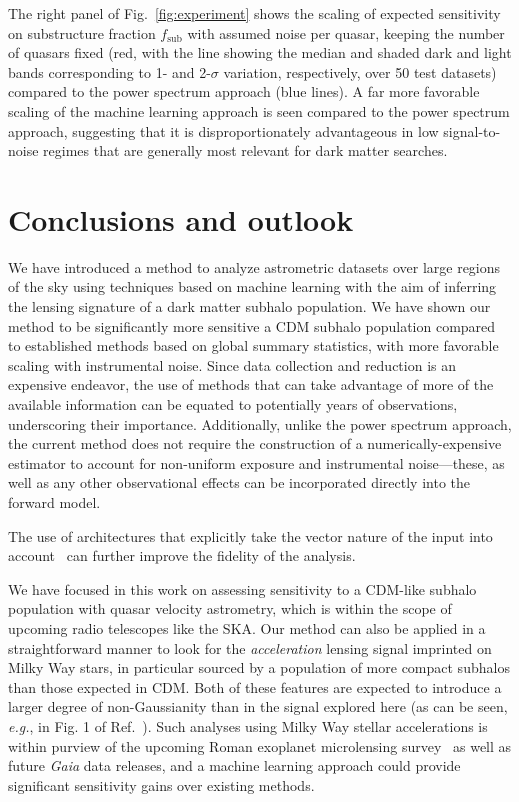 \documentclass[preprint]{article}
\begin{document}
The right panel of Fig.~\ref{fig:experiment} shows the scaling of expected sensitivity on substructure fraction $f_\mathrm{sub}$ with assumed noise per quasar, keeping the number of quasars fixed (red, with the line showing the median and shaded dark and light bands corresponding to 1- and 2-$\sigma$ variation, respectively, over 50 test datasets) compared to the power spectrum approach (blue lines). A far more favorable scaling of the machine learning approach is seen compared to the power spectrum approach, suggesting that it is disproportionately advantageous in low signal-to-noise regimes that are generally most relevant for dark matter searches.

\section{Conclusions and outlook}
\label{sec:conclusions}

We have introduced a method to analyze astrometric datasets over large regions of the sky using techniques based on machine learning with the aim of inferring the lensing signature of a dark matter subhalo population. We have shown our method to be significantly more sensitive a CDM subhalo population compared to established methods based on global summary statistics, with more favorable scaling with instrumental noise. Since data collection and reduction is an expensive endeavor, the use of methods that can take advantage of more of the available information can be equated to potentially years of observations, underscoring their importance. Additionally, unlike the power spectrum approach, the current method does not require the construction of a numerically-expensive estimator to account for non-uniform exposure and instrumental noise---these, as well as any other observational effects can be incorporated directly into the forward model. 

The use of architectures that explicitly take the vector nature of the input into account~\cite{esteves2020spinweighted} can further improve the fidelity of the analysis. \cite{Cheng:2020qbx,2021arXiv210709145H,2021arXiv210411244S,2021arXiv210202828M}


We have focused in this work on assessing sensitivity to a CDM-like subhalo population with quasar velocity astrometry, which is within the scope of upcoming radio telescopes like the SKA. Our method can also be applied in a straightforward manner to look for the \emph{acceleration} lensing signal imprinted on Milky Way stars, in particular sourced by a population of more compact subhalos than those expected in CDM. Both of these features are expected to introduce a larger degree of non-Gaussianity than in the signal explored here (as can be seen, \emph{e.g.}, in Fig. 1 of Ref.~\cite{Mishra-Sharma:2020ynk}). Such analyses using Milky Way stellar accelerations is within purview of the upcoming Roman exoplanet microlensing survey~\cite{Pardo:2021uzy} as well as future \emph{Gaia} data releases, and a machine learning approach could provide significant sensitivity gains over existing methods.
\end{document}
